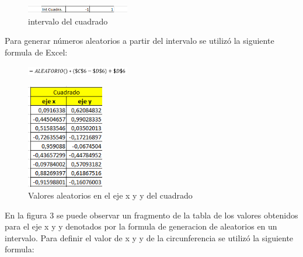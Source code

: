 \documentclass[letterpaper, 10 pt, conference]{ieeeconf}
\begin{document}
\begin{figure}[!ht]
\centering
\includegraphics[width=0.4\textwidth]{images/intervalo.png}
\caption{intervalo del cuadrado}
\label{fig:estructurados}
\end{figure}
Para generar números aleatorios a partir del intervalo se utilizó la siguiente formula de Excel:
\begin{figure}[!ht]
\centering
\includegraphics[width=0.4\textwidth]{images/form1.png}
\label{fig:estructurados}
\end{figure}

\begin{figure}[!ht]
\centering
\includegraphics[width=0.3\textwidth]{images/cuad.png}
\caption{Valores aleatorios en el eje x y y del cuadrado }
\label{fig:estructurados}
\end{figure}

En la figura 3 se puede observar un fragmento de la tabla de los valores obtenidos para el eje x y y denotados por la formula de generacion de aleatorios en un intervalo.
\newline
\newline
Para definir el valor de x y y de la circunferencia se utilizó la siguiente formula:
\end{document}
